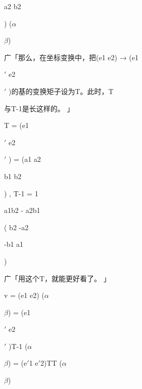 a2 b2\par
) ($\alpha$\par
$\beta$)\par
广「那么，在坐标变换中，把(e1 e2) → (e1\par
$\prime$ e2\par
$\prime$ )的基的变换矩子设为T。此时，T\par
与T-1是长这样的。 」\par
T = (e1\par
$\prime$ e2\par
$\prime$ ) = (a1 a2\par
b1 b2\par
) , T-1 = 1\par
a1b2 - a2b1\par
( b2 -a2\par
-b1 a1\par
)\par
广「用这个T，就能更好看了。 」\par
v = (e1 e2) ($\alpha$\par
$\beta$) = (e1\par
$\prime$ e2\par
$\prime$ )T-1 ($\alpha$\par
$\beta$) = (e$\prime$1 e$\prime$2)TT ($\alpha$\par
$\beta$)\par

